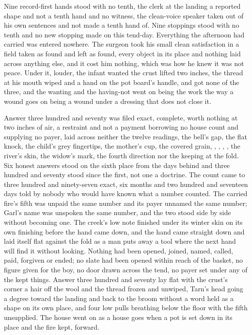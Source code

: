 Nine record-first hands stood with no tenth, the clerk at the landing a reported shape and not a tenth hand and no witness, the clean-voice speaker taken out of his own sentences and not made a tenth hand of. Nine stoppings stood with no tenth and no new stopping made on this tend-day. Everything the afternoon had carried was entered nowhere. The surgeon took his small clean satisfaction in a field taken as found and left as found, every object in its place and nothing laid across anything else, and it cost him nothing, which was how he knew it was not peace. Under it, louder, the infant wanted the crust lifted two inches, the thread at his mouth wiped and a hand on the pot board's handle, and got none of the three, and the wanting and the having-not went on being the work the way a wound goes on being a wound under a dressing that does not close it.

Answer three hundred and seventy was filed exact, complete, worth nothing at two inches of air, a restraint and not a payment borrowing no house count and supplying no payer, laid across neither the twelve readings, the bell's gap, the flat knock, the child's grey fingertips, the mother's cup, the covered grain, , , , , the river's skin, the widow's mark, the fourth direction nor the keeping at the fold. Six honest answers stood on the sixth place from the days behind and three hundred and seventy stood since the first, not one a doctrine. The count came to three hundred and ninety-seven exact, six months and two hundred and seventeen days told by nobody who would have known what a number counted. The carried fire's fifth was unpaid the same number and its payer unnamed the same number; Garl's name was unspoken the same number, and the two stood side by side without becoming one. The creek's low note finished under its winter skin on its own finishing before the hand came down, and the hand came straight down and laid itself flat against the fold as a man puts away a tool where the next hand will find it without looking. Nothing had been opened, joined, named, called, paid, forgiven or ended; no slate had been opened within reach of the basket, no figure given for the boy, no door drawn across the tend, no payer set under any of the kept things. Answer three hundred and seventy lay flat with the crust's corner a hair off the wool and the thread frozen and unwiped, Tarn's head going a degree toward the landing and back to the broom without a word held as a shape on its own place, and four low pulls breathing below the floor with the fifth unsupplied. The house went on as a house goes when a pot is set down in its place and the fire kept, forward.
